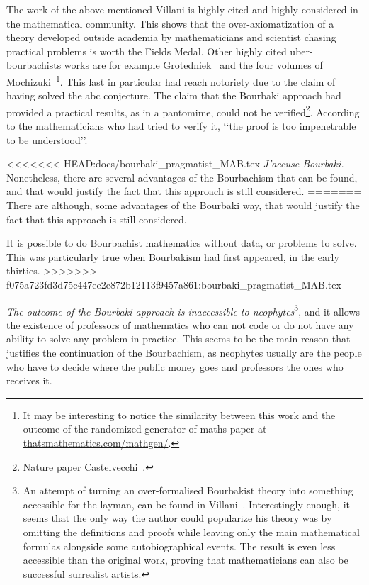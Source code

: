 \documentclass[]{scrartcl}
\theoremstyle{definition}
\begin{document}
The work of the above mentioned Villani is highly cited and highly considered in the mathematical community. 
This shows that the over-axiomatization of a theory developed outside academia by mathematicians and scientist chasing practical problems is worth the Fields Medal.
Other highly cited uber-bourbachists works are for example Grotedniek~\cite{grothendieck2011some} and the four volumes of Mochizuki~\cite{mochizuki2012inter}\footnote{
    It may be interesting to notice the similarity between this work and the outcome of the randomized generator of maths paper at \href{https://thatsmathematics.com/mathgen/}{thatsmathematics.com/mathgen/}.
}. This last in particular had reach notoriety due to the claim of having solved the abc conjecture. The claim that the Bourbaki approach had provided a practical results, as in a pantomime, could not be verified\footnote{Nature paper Castelvecchi~\cite{castelvecchi2015biggest}.}. According to the mathematicians who had tried to verify it, \lq\lq the proof is too impenetrable to be understood\rq\rq.

<<<<<<< HEAD:docs/bourbaki_pragmatist_MAB.tex
\emph{J'accuse Bourbaki.} Nonetheless, there are several advantages of the Bourbachism that can be found, and that would justify the fact that this approach is still considered.
=======
There are although, some advantages of the Bourbaki way, that would justify the fact that this approach is still considered.

It is possible to do Bourbachist mathematics without data, or problems to solve. This was particularly true when Bourbakism had first appeared, in the early thirties.
>>>>>>> f075a723fd3d75c447ee2e872b12113f9457a861:bourbaki_pragmatist_MAB.tex

\emph{The outcome of the Bourbaki approach is inaccessible to neophytes}\footnote{
    An attempt of turning an over-formalised Bourbakist theory into something accessible for the layman, can be found in Villani~\cite{villani2003livingtheorem}. Interestingly enough, it seems that the only way the author could popularize his theory was by omitting the definitions and proofs while leaving only the main mathematical formulas alongside some autobiographical events. The result is even less accessible than the original work, proving that mathematicians can also be successful surrealist artists.
}, and it allows the existence of professors of mathematics who can not code or do not have any ability to solve any problem in practice. This seems to be the main reason that justifies the continuation of the Bourbachism, as neophytes usually are the people who have to decide where the public money goes and professors the ones who receives it.
\end{document}
